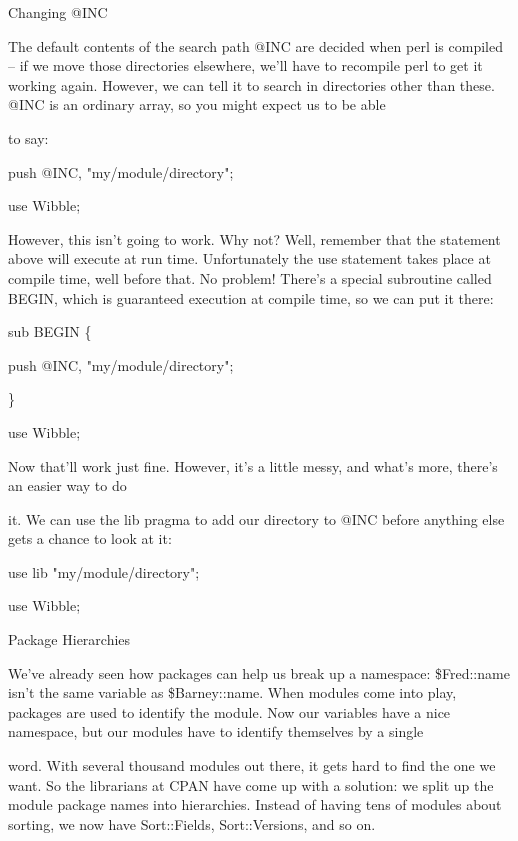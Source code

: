 \documentclass[a4paper,11pt]{book}
\begin{document}
\noindent 

\noindent Changing @INC

\noindent 

\noindent The default contents of the search path @INC are decided when perl is compiled -- if we move those directories elsewhere, we'll have to recompile perl to get it working again. However, we can tell it to search in directories other than these. @INC is an ordinary array, so you might expect us to be able

\noindent to say:

\noindent 

\noindent push @INC, "my/module/directory";

\noindent use Wibble;

\noindent 

\noindent However, this isn't going to work. Why not? Well, remember that the statement above will execute at run time. Unfortunately the use statement takes place at compile time, well before that. No problem! There's a special subroutine called BEGIN, which is guaranteed execution at compile time, so we can put it there:

\noindent 

\noindent sub BEGIN \{

\noindent push @INC, "my/module/directory";

\noindent \}

\noindent use Wibble;

\noindent 

\noindent Now that'll work just fine. However, it's a little messy, and what's more, there's an easier way to do

\noindent it. We can use the lib pragma to add our directory to @INC before anything else gets a chance to look at it:

\noindent 

\noindent use lib "my/module/directory";

\noindent use Wibble;

\noindent 

\noindent 

\noindent Package Hierarchies

\noindent We've already seen how packages can help us break up a namespace: \$Fred::name isn't the same variable as \$Barney::name. When modules come into play, packages are used to identify the module. Now our variables have a nice namespace, but our modules have to identify themselves by a single

\noindent word. With several thousand modules out there, it gets hard to find the one we want. So the librarians at CPAN have come up with a solution: we split up the module package names into hierarchies. Instead of having tens of modules about sorting, we now have Sort::Fields, Sort::Versions, and so on.
\end{document}

